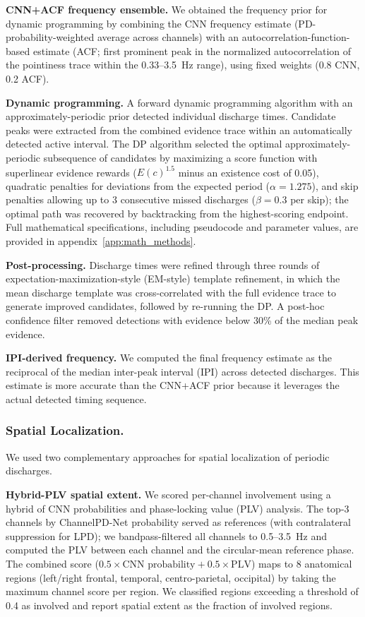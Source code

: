 \documentclass{iopjournal}
\begin{document}
\textbf{CNN+ACF frequency ensemble.} We obtained the frequency prior for dynamic programming by combining the CNN frequency estimate (PD-probability-weighted average across channels) with an autocorrelation-function-based estimate (ACF; first prominent peak in the normalized autocorrelation of the pointiness trace within the 0.33--3.5~Hz range), using fixed weights (0.8 CNN, 0.2 ACF).

\textbf{Dynamic programming.} A forward dynamic programming algorithm with an approximately-periodic prior detected individual discharge times. Candidate peaks were extracted from the combined evidence trace within an automatically detected active interval. The DP algorithm selected the optimal approximately-periodic subsequence of candidates by maximizing a score function with superlinear evidence rewards ($E(c)^{1.5}$ minus an existence cost of 0.05), quadratic penalties for deviations from the expected period ($\alpha = 1.275$), and skip penalties allowing up to 3 consecutive missed discharges ($\beta = 0.3$ per skip); the optimal path was recovered by backtracking from the highest-scoring endpoint. Full mathematical specifications, including pseudocode and parameter values, are provided in appendix~\ref{app:math_methods}.

\textbf{Post-processing.} Discharge times were refined through three rounds of expectation-maximization-style (EM-style) template refinement, in which the mean discharge template was cross-correlated with the full evidence trace to generate improved candidates, followed by re-running the DP. A post-hoc confidence filter removed detections with evidence below 30\% of the median peak evidence.

\textbf{IPI-derived frequency.} We computed the final frequency estimate as the reciprocal of the median inter-peak interval (IPI) across detected discharges. This estimate is more accurate than the CNN+ACF prior because it leverages the actual detected timing sequence.

\subsubsection{Spatial Localization.}

We used two complementary approaches for spatial localization of periodic discharges.

\textbf{Hybrid-PLV spatial extent.} We scored per-channel involvement using a hybrid of CNN probabilities and phase-locking value (PLV) analysis. The top-3 channels by ChannelPD-Net probability served as references (with contralateral suppression for LPD); we bandpass-filtered all channels to 0.5--3.5~Hz and computed the PLV between each channel and the circular-mean reference phase. The combined score ($0.5 \times \text{CNN probability} + 0.5 \times \text{PLV}$) maps to 8 anatomical regions (left/right frontal, temporal, centro-parietal, occipital) by taking the maximum channel score per region. We classified regions exceeding a threshold of 0.4 as involved and report spatial extent as the fraction of involved regions.
\end{document}
